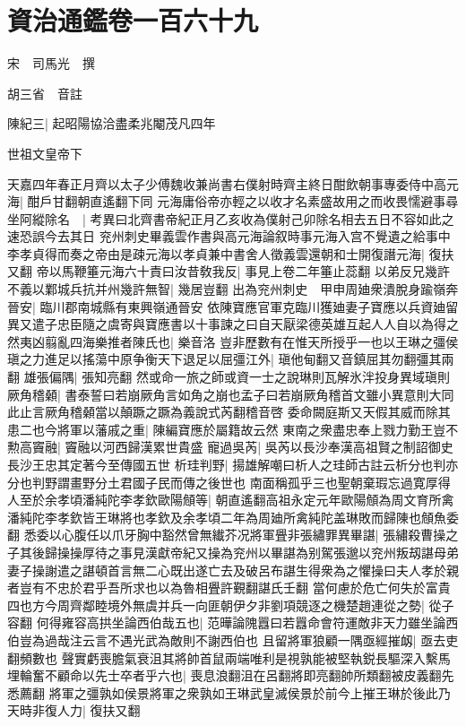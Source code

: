 \chapter{資治通鑑卷一百六十九}
宋　司馬光　撰

胡三省　音註

陳紀三|{
	起昭陽協洽盡柔兆閹茂凡四年}


世祖文皇帝下

天嘉四年春正月齊以太子少傅魏收兼尚書右僕射時齊主終日酣飲朝事專委侍中高元海|{
	酣戶甘翻朝直遙翻下同}
元海庸俗帝亦輕之以收才名素盛故用之而收畏懦避事尋坐阿縱除名　|{
	考異曰北齊書帝紀正月乙亥收為僕射己卯除名相去五日不容如此之速恐誤今去其日}
兖州刺史畢義雲作書與高元海論叙時事元海入宫不覺遺之給事中李孝貞得而奏之帝由是疎元海以孝貞兼中書舍人徵義雲還朝和士開復譖元海|{
	復扶又翻}
帝以馬鞭箠元海六十責曰汝昔敎我反|{
	事見上卷二年箠止蕊翻}
以弟反兄幾許不義以鄴城兵抗并州幾許無智|{
	幾居豈翻}
出為兖州刺史　甲申周廸衆潰脫身踰嶺奔晉安|{
	臨川郡南城縣有東興嶺通晉安}
依陳寶應官軍克臨川獲廸妻子寶應以兵資廸留異又遣子忠臣隨之虞寄與寶應書以十事諫之曰自天厭梁德英雄互起人人自以為得之然夷凶翦亂四海樂推者陳氏也|{
	樂音洛}
豈非歷數有在惟天所授乎一也以王琳之彊侯瑱之力進足以搖蕩中原争衡天下退足以屈彊江外|{
	瑱他甸翻又音鎮屈其勿翻彊其兩翻}
雄張偏隅|{
	張知亮翻}
然或命一旅之師或資一士之說琳則瓦解氷泮投身異域瑱則厥角稽顙|{
	書泰誓曰若崩厥角言如角之崩也孟子曰若崩厥角稽首文雖小異意則大同此止言厥角稽顙當以顛蹶之蹶為義說式芮翻稽音啓}
委命闕庭斯又天假其威而除其患二也今將軍以藩戚之重|{
	陳編寶應於屬籍故云然}
東南之衆盡忠奉上戮力勤王豈不勲高竇融|{
	竇融以河西歸漢累世貴盛}
寵過吳芮|{
	吳芮以長沙奉漢高祖賢之制詔御史長沙王忠其定著今至傳國五世}
析珪判野|{
	揚雄解嘲曰析人之珪師古註云析分也判亦分也判野謂畫野分土君國子民而傳之後世也}
南面稱孤乎三也聖朝棄瑕忘過寛厚得人至於余孝頃潘純陀李孝欽歐陽頠等|{
	朝直遙翻高祖永定元年歐陽頠為周文育所禽潘純陀李孝欽皆王琳將也孝欽及余孝頃二年為周廸所禽純陀盖琳敗而歸陳也頠魚委翻}
悉委以心腹任以爪牙胸中豁然曾無纎芥况將軍舋非張繡罪異畢諶|{
	張繡殺曹操之子其後歸操操厚待之事見漢獻帝紀又操為兖州以畢諶為别駕張邈以兖州叛刼諶母弟妻子操謝遣之諶頓首言無二心既出遂亡去及破呂布諶生得衆為之懼操曰夫人孝於親者豈有不忠於君乎吾所求也以為魯相舋許覲翻諶氏壬翻}
當何慮於危亡何失於富貴四也方今周齊鄰睦境外無虞并兵一向匪朝伊夕非劉項競逐之機楚趙連從之勢|{
	從子容翻}
何得雍容高拱坐論西伯哉五也|{
	范曄論隗囂曰若囂命會符運敵非天力雖坐論西伯豈為過哉注云言不遇光武為敵則不謝西伯也}
且留將軍狼顧一隅亟經摧衂|{
	亟去吏翻頻數也}
聲實虧喪膽氣衰沮其將帥首鼠兩端唯利是視孰能被堅執鋭長驅深入繫馬埋輪奮不顧命以先士卒者乎六也|{
	喪息浪翻沮在呂翻將即亮翻帥所類翻被皮義翻先悉薦翻}
將軍之彊孰如侯景將軍之衆孰如王琳武皇滅侯景於前今上摧王琳於後此乃天時非復人力|{
	復扶又翻}
